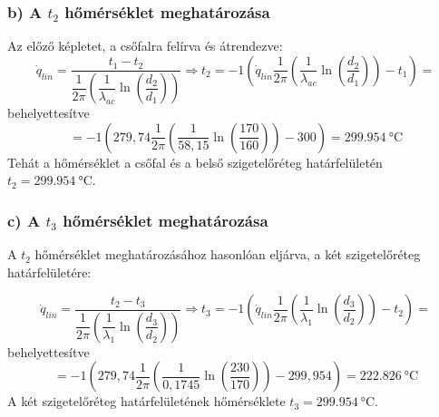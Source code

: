\subsubsection*{b) A $t_2$ hőmérséklet meghatározása }
Az előző képletet, a csőfalra felírva és átrendezve:
\begin{equation}
	\dot{q}_{lin} = \dfrac {t_1 - t_2}{\dfrac{1}{2 \pi} \left(\dfrac {1}{\lambda_{ac}} \ln ( \dfrac {d_2}{d_1})\right)} \Rightarrow t_2 = -1 \left(\dot{q}_{lin} \dfrac{1}{2 \pi} \left(\dfrac {1}{\lambda_{ac}} \ln ( \dfrac {d_2}{d_1})\right) - t_1 \right) = 
\end{equation}
behelyettesítve
\begin{equation*}
	= -1 \left(279,74 \dfrac{1}{2 \pi} \left(\dfrac {1}{58,15} \ln ( \dfrac {170}{160})\right) - 300 \right) = \SI{299,954}{\celsius}
\end{equation*}
Tehát a hőmérséklet a csőfal és a belső szigetelőréteg határfelületén $t_2 = \SI{299,954}{\celsius}$.


\subsubsection*{c) A $t_3$ hőmérséklet meghatározása }
A $t_2$ hőmérséklet meghatározásához hasonlóan eljárva, a két szigetelőréteg határfelületére:

\begin{equation}
\dot{q}_{lin} = \dfrac {t_2 - t_3}{\dfrac{1}{2 \pi} \left(\dfrac {1}{\lambda_{1}} \ln ( \dfrac {d_3}{d_2})\right)} \Rightarrow t_3 = -1 \left(\dot{q}_{lin} \dfrac{1}{2 \pi} \left(\dfrac {1}{\lambda_{1}} \ln ( \dfrac {d_3}{d_2})\right) - t_2 \right) = 
\end{equation}
behelyettesítve
\begin{equation*}
	= -1 \left(279,74 \dfrac{1}{2 \pi} \left(\dfrac {1}{0,1745} \ln ( \dfrac {230}{170})\right) - 299,954 \right) = \SI{222,826}{\celsius}
\end{equation*}
A két szigetelőréteg határfelületének hőmérséklete $t_3 =\SI{299,954}{\celsius}$. 

\pagebreak

